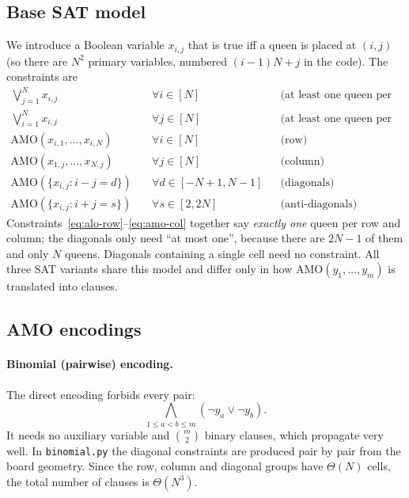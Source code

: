 \documentclass[a4paper,fleqn]{cas-sc}
\begin{document}
\subsection{Base SAT model}\label{sec:satbase}
We introduce a Boolean variable $x_{i,j}$ that is true iff a queen is placed at $(i,j)$ (so there are $N^2$ primary variables, numbered $(i-1)N+j$ in the code).
The constraints are
\begin{align}
 \textstyle\bigvee_{j=1}^{N} x_{i,j} &\quad \forall i\in[N] && \text{(at least one queen per row)} \label{eq:alo-row}\\
 \textstyle\bigvee_{i=1}^{N} x_{i,j} &\quad \forall j\in[N] && \text{(at least one queen per column)} \label{eq:alo-col}\\
 \mathrm{AMO}(x_{i,1},\dots,x_{i,N}) &\quad \forall i\in[N] && \text{(row)} \label{eq:amo-row}\\
 \mathrm{AMO}(x_{1,j},\dots,x_{N,j}) &\quad \forall j\in[N] && \text{(column)} \label{eq:amo-col}\\
 \mathrm{AMO}(\{x_{i,j} : i-j=d\}) &\quad \forall d\in[-N+1,N-1] && \text{(diagonals)} \label{eq:amo-diag}\\
 \mathrm{AMO}(\{x_{i,j} : i+j=s\}) &\quad \forall s\in[2,2N] && \text{(anti-diagonals)} \label{eq:amo-anti}
\end{align}
Constraints~\eqref{eq:alo-row}--\eqref{eq:amo-col} together say \emph{exactly one} queen per row and column; the diagonals only need ``at most one'', because there are $2N-1$ of them and only $N$ queens.
Diagonals containing a single cell need no constraint.
All three SAT variants share this model and differ only in how $\mathrm{AMO}(y_1,\dots,y_m)$ is translated into clauses.

\subsection{AMO encodings}
\paragraph{Binomial (pairwise) encoding.}
The direct encoding forbids every pair:
\begin{equation}
 \bigwedge_{1\le a<b\le m} (\lnot y_a\lor\lnot y_b).
\end{equation}
It needs no auxiliary variable and $\binom m2$ binary clauses, which propagate very well.
In \texttt{binomial.py} the diagonal constraints are produced pair by pair from the board geometry.
Since the row, column and diagonal groups have $\Theta(N)$ cells, the total number of clauses is $\Theta(N^3)$.
\end{document}
